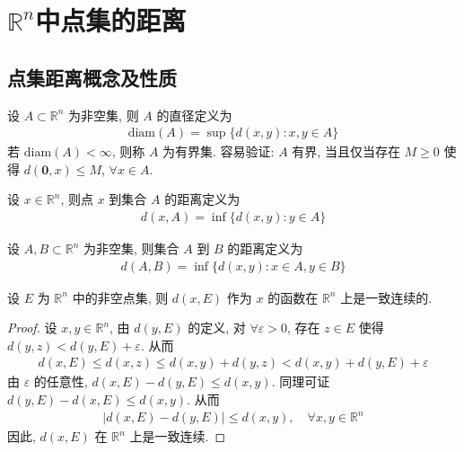 \documentclass[../../main.tex]{subfiles}
\begin{document}
\section{$\mathbb{R}^n$中点集的距离}

\subsection{点集距离概念及性质}

\begin{definition}
设 $A \subset \mathbb{R}^n$ 为非空集, 则 $A$ 的直径定义为
\begin{align*}
\mathrm{diam}(A) = \sup\{d(x, y) : x, y \in A\}
\end{align*}
若 $\mathrm{diam}(A) < \infty$, 则称 $A$ 为有界集. 容易验证: $A$ 有界, 当且仅当存在 $M \geqslant 0$ 使得 $d(\mathbf{0}, x) \leqslant M$, $\forall x \in A$.

设 $x \in \mathbb{R}^n$, 则点 $x$ 到集合 $A$ 的距离定义为
\begin{align*}
d(x, A) = \inf\{d(x, y) : y \in A\}
\end{align*}

设 $A, B \subset \mathbb{R}^n$ 为非空集, 则集合 $A$ 到 $B$ 的距离定义为
\begin{align*}
d(A, B) = \inf\{d(x, y) : x \in A, y \in B\}
\end{align*}
\end{definition}

\begin{proposition}\label{proposition:点与集合之间的距离函数在R^n上一致连续}
设 $E$ 为 $\mathbb{R}^n$ 中的非空点集, 则 $d(x, E)$ 作为 $x$ 的函数在 $\mathbb{R}^n$ 上是一致连续的.
\end{proposition}
\begin{proof}
设 $x, y \in \mathbb{R}^n$, 由 $d(y, E)$ 的定义, 对 $\forall \varepsilon > 0$, 存在 $z \in E$ 使得 $d(y, z) < d(y, E) + \varepsilon$. 从而
\begin{align*}
d(x, E) \leqslant d(x, z) \leqslant d(x, y) + d(y, z) < d(x, y) + d(y, E) + \varepsilon
\end{align*}
由 $\varepsilon$ 的任意性, $d(x, E) - d(y, E) \leqslant d(x, y)$. 同理可证 $d(y, E) - d(x, E) \leqslant d(x, y)$. 从而
\begin{align*}
|d(x, E) - d(y, E)| \leqslant d(x, y), \quad \forall x, y \in \mathbb{R}^n
\end{align*}
因此, $d(x, E)$ 在 $\mathbb{R}^n$ 上是一致连续.

\end{proof}
\end{document}
